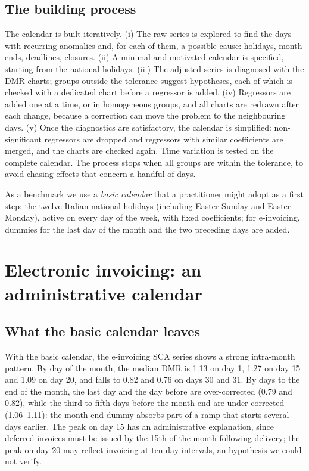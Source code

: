 \documentclass[Afour, times]{sagej}
\begin{document}
\subsection{The building process}
\label{subsec:process}

The calendar is built iteratively. (i) The raw series is explored to find the days with recurring anomalies and, for each of them, a possible cause: holidays, month ends, deadlines, closures. (ii) A minimal and motivated calendar is specified, starting from the national holidays. (iii) The adjusted series is diagnosed with the DMR charts; groups outside the tolerance suggest hypotheses, each of which is checked with a dedicated chart before a regressor is added. (iv) Regressors are added one at a time, or in homogeneous groups, and all charts are redrawn after each change, because a correction can move the problem to the neighbouring days. (v) Once the diagnostics are satisfactory, the calendar is simplified: non-significant regressors are dropped and regressors with similar coefficients are merged, and the charts are checked again. Time variation is tested on the complete calendar. The process stops when all groups are within the tolerance, to avoid chasing effects that concern a handful of days.

As a benchmark we use a \emph{basic calendar} that a practitioner might adopt as a first step: the twelve Italian national holidays (including Easter Sunday and Easter Monday), active on every day of the week, with fixed coefficients; for e-invoicing, dummies for the last day of the month and the two preceding days are added.

\section{Electronic invoicing: an administrative calendar}
\label{sec:einv}

\subsection{What the basic calendar leaves}

With the basic calendar, the e-invoicing SCA series shows a strong intra-month pattern. By day of the month, the median DMR is 1.13 on day 1, 1.27 on day 15 and 1.09 on day 20, and falls to 0.82 and 0.76 on days 30 and 31. By days to the end of the month, the last day and the day before are over-corrected (0.79 and 0.82), while the third to fifth days before the month end are under-corrected (1.06--1.11): the month-end dummy absorbs part of a ramp that starts several days earlier. The peak on day 15 has an administrative explanation, since deferred invoices must be issued by the 15th of the month following delivery; the peak on day 20 may reflect invoicing at ten-day intervals, an hypothesis we could not verify.
\end{document}
